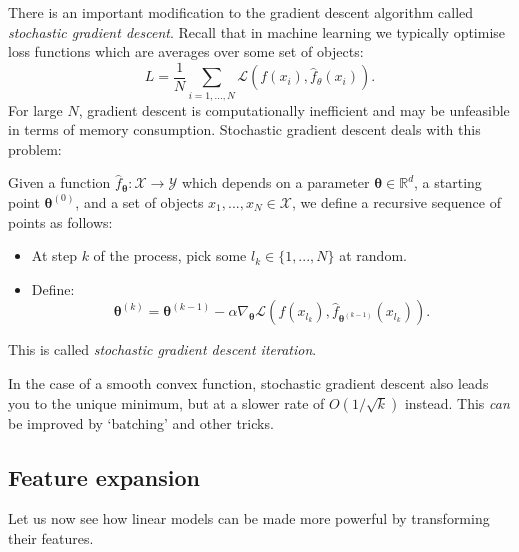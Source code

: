 There is an important modification to the gradient descent algorithm called \textit{stochastic gradient descent}. Recall that in machine learning we typically optimise loss functions which are averages over some set of objects:
\begin{equation*}
L = \frac{1}{N} \sum_{i=1,...,N} \mathcal{L}\left(f(x_i), \hat{f}_{\theta}(x_i) \right).
\end{equation*}
For large $N$, gradient descent is computationally inefficient and may be unfeasible in terms of memory consumption. Stochastic gradient descent deals with this problem:
\begin{framedef}
Given a function $\hat{f}_{\pmb{\theta}} : \mathcal{X} \rightarrow \mathcal{Y}$ which depends on a parameter $\pmb{\theta} \in \mathbb{R}^d$, a starting point $\pmb{\theta}^{(0)}$, and a set of objects $x_1,...,x_N \in \mathcal{X}$, we define a recursive sequence of points as follows:
\begin{itemize}
\item At step $k$ of the process, pick some $l_k \in \{1,...,N\}$ at random.
\item Define:
\begin{equation*}
\pmb{\theta}^{(k)} = \pmb{\theta}^{(k-1)} - \alpha \nabla_{\pmb{\theta}} \mathcal{L}\left(f(x_{l_k}), \hat{f}_{\pmb{\theta}^{(k-1)}}(x_{l_k}) \right).
\end{equation*}
\end{itemize}
This is called \textit{stochastic gradient descent iteration}.
\end{framedef}

In the case of a smooth convex function, stochastic gradient descent also leads you to the unique minimum, but at a slower rate of $O(1/\sqrt{k})$ instead. This \textit{can} be improved by `batching' and other tricks.



\newpage
\subsection{Feature expansion}
Let us now see how linear models can be made more powerful by transforming their features.

